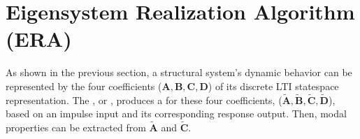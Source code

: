 \documentclass[letterpaper,10pt,english]{sphinxmanual}
\begin{document}
\section{Eigensystem Realization Algorithm (ERA)}
\label{\detokenize{theory/era:eigensystem-realization-algorithm-era}}\label{\detokenize{theory/era::doc}}
\sphinxAtStartPar
As shown in the previous section, a structural system’s dynamic behavior
can be represented by the four coefficients
(\(\mathbf{A},\mathbf{B},\mathbf{C},\mathbf{D}\)) of its discrete
LTI state\sphinxhyphen{}space representation. The , or
,
produces a  for these four coefficients,
(\(\mathbf{\tilde{A}},\mathbf{\tilde{B}},\mathbf{\tilde{C}},\mathbf{\tilde{D}}\)),
based on an impulse input and its corresponding response output. Then,
modal properties can be extracted from \(\mathbf{\tilde{A}}\) and
\(\mathbf{\tilde{C}}\).
\end{document}
